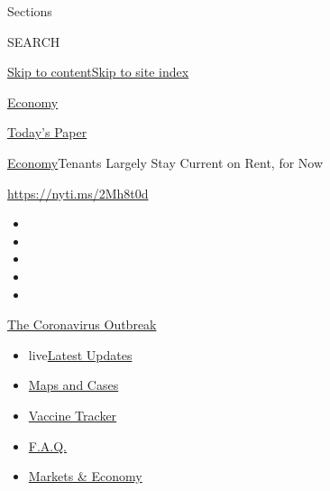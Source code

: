 Sections

SEARCH

\protect\hyperlink{site-content}{Skip to
content}\protect\hyperlink{site-index}{Skip to site index}

\href{https://www.nytimes.com/section/business/economy}{Economy}

\href{https://myaccount.nytimes.com/auth/login?response_type=cookie\&client_id=vi}{}

\href{https://www.nytimes.com/section/todayspaper}{Today's Paper}

\href{/section/business/economy}{Economy}\textbar{}Tenants Largely Stay
Current on Rent, for Now

\href{https://nyti.ms/2Mh8t0d}{https://nyti.ms/2Mh8t0d}

\begin{itemize}
\item
\item
\item
\item
\item
\end{itemize}

\href{https://www.nytimes.com/news-event/coronavirus?action=click\&pgtype=Article\&state=default\&region=TOP_BANNER\&context=storylines_menu}{The
Coronavirus Outbreak}

\begin{itemize}
\tightlist
\item
  live\href{https://www.nytimes.com/2020/08/08/world/coronavirus-updates.html?action=click\&pgtype=Article\&state=default\&region=TOP_BANNER\&context=storylines_menu}{Latest
  Updates}
\item
  \href{https://www.nytimes.com/interactive/2020/us/coronavirus-us-cases.html?action=click\&pgtype=Article\&state=default\&region=TOP_BANNER\&context=storylines_menu}{Maps
  and Cases}
\item
  \href{https://www.nytimes.com/interactive/2020/science/coronavirus-vaccine-tracker.html?action=click\&pgtype=Article\&state=default\&region=TOP_BANNER\&context=storylines_menu}{Vaccine
  Tracker}
\item
  \href{https://www.nytimes.com/interactive/2020/world/coronavirus-tips-advice.html?action=click\&pgtype=Article\&state=default\&region=TOP_BANNER\&context=storylines_menu}{F.A.Q.}
\item
  \href{https://www.nytimes.com/live/2020/08/07/business/stock-market-today-coronavirus?action=click\&pgtype=Article\&state=default\&region=TOP_BANNER\&context=storylines_menu}{Markets
  \& Economy}
\end{itemize}

